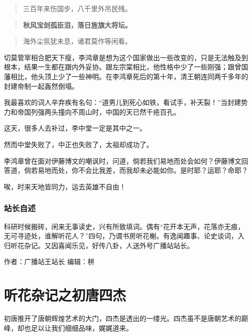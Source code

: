 \documentclass[
]{book}
\begin{document}
\begin{quote}
三百年来伤国步，八千里外吊民残。
\end{quote}

\begin{quote}
\textbf{秋风宝剑孤臣泪，落日旌旗大将坛。}
\end{quote}

\begin{quote}
海外尘氛犹未息，诸君莫作等闲看。
\end{quote}

切莫管宰相合肥天下瘦，李鸿章是想为这个国家做出一些改变的，只是无法触及到根本，结果一生都在跟内外妥协。跟左宗棠相比，他性格中少了一些刚强；跟曾国藩相比，他头顶上少了一些神明。在李鸿章死后的第十年，清王朝连同两千多年的封建帝制一起轰然倒塌。

我最喜欢的词人辛弃疾有名句：``道男儿到死心如铁，看试手，补天裂！''当封建势力和帝国列强两头撞向不周山时，中国的天已然千疮百孔。

这天，很多人去补过，李中堂一定是其中之一。

然而中堂失败了，中正也失败了，太祖却成功了。

李鸿章曾在面对伊藤博文的嘲讽时，问道，倘若我们易地而处会如何？伊藤博文回答道，倘若易地而处，你不会比我差，而我却未必能如你。是时耶？运耶？命耶？

唉，时来天地皆同力，运去英雄不自由！

\hypertarget{ux7ad9ux957fux81eaux8ff0}{%
\subsubsection*{站长自述}\label{ux7ad9ux957fux81eaux8ff0}}

科研时候搬砖，闲来无事读史，兴有所致填词。偶有``花开本无声，花落亦无痕，无可寻迹处，谁解听花人？''四句，乃谓书房听花榭。有逸闻趣事、论史谈词，入归听花杂记。又因喜闻乐见，好传八卦，人送外号广播站站长。

作者：广播站王站长
编辑：栟

\hypertarget{ux542cux82b1ux6742ux8bb0ux4e4bux521dux5510ux56dbux6770}{%
\section{听花杂记之初唐四杰}\label{ux542cux82b1ux6742ux8bb0ux4e4bux521dux5510ux56dbux6770}}

初唐推开了唐朝辉煌艺术的大门，四杰是透出的一缕光。四杰虽不是唐朝艺术的巅峰，却也足以让我们细细品味，娓娓道来。
\end{document}
